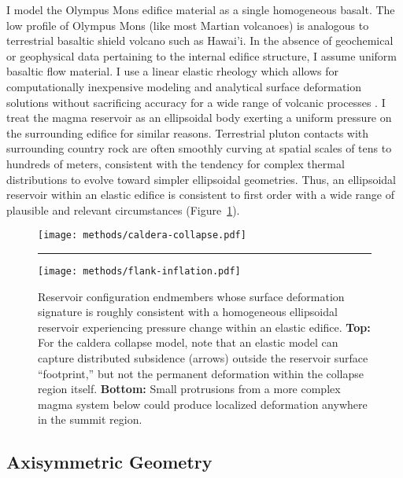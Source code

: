I model the Olympus Mons edifice material as a single homogeneous basalt. The low profile of Olympus Mons (like most Martian volcanoes) is analogous to terrestrial basaltic shield volcano such as Hawai'i. In the absence of geochemical or geophysical data pertaining to the internal edifice structure, I assume uniform basaltic flow material. I use a linear elastic rheology which allows for computationally inexpensive modeling and analytical surface deformation solutions \parencite{mogi_relations_1958} without sacrificing accuracy for a wide range of volcanic processes \parencite{grosfils_elastic_2015}. I treat the magma reservoir as an ellipsoidal body exerting a uniform pressure on the surrounding edifice for similar reasons. Terrestrial pluton contacts with surrounding country rock are often smoothly curving at spatial scales of tens to hundreds of meters, consistent with the tendency for complex thermal distributions to evolve toward simpler ellipsoidal geometries. Thus, an ellipsoidal reservoir within an elastic edifice is consistent to first order with a wide range of plausible and relevant circumstances (Figure~\ref{fig:reservoir-configs}).

\begin{figure}
    \texttt{[image: methods/caldera-collapse.pdf]}\\
    \vspace{1cm}
    \hrule
    \vspace{1cm}
    \texttt{[image: methods/flank-inflation.pdf]}
    \caption[Ellipsoidal reservoir configurations]{Reservoir configuration endmembers whose surface deformation signature is roughly consistent with a homogeneous ellipsoidal reservoir experiencing pressure change within an elastic edifice. \textbf{Top:} For the caldera collapse model, note that an elastic model can capture distributed subsidence (arrows) outside the reservoir surface ``footprint,'' but not the permanent deformation within the collapse region itself. \textbf{Bottom:} Small protrusions from a more complex magma system below could produce localized deformation anywhere in the summit region.}
    \label{fig:reservoir-configs}
\end{figure}

\subsection{Axisymmetric Geometry}

